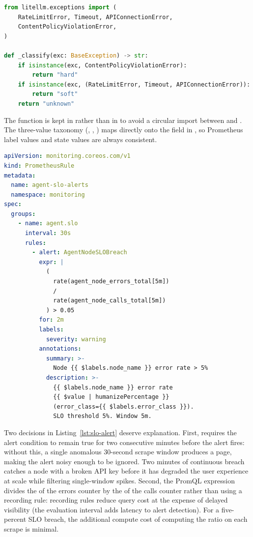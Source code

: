 \begin{lstlisting}[language=Python,
  caption={Exception classifier for Prometheus labels ---
    \texttt{src/observability/metrics.py} (continued)},
  label={lst:exception-classifier}]
from litellm.exceptions import (
    RateLimitError, Timeout, APIConnectionError,
    ContentPolicyViolationError,
)

def _classify(exc: BaseException) -> str:
    if isinstance(exc, ContentPolicyViolationError):
        return "hard"
    if isinstance(exc, (RateLimitError, Timeout, APIConnectionError)):
        return "soft"
    return "unknown"
\end{lstlisting}

The  function is kept in  rather than in
 to avoid a circular import between
 and . The three-value
taxonomy (, , ) maps directly
onto the  field in , so Prometheus
label values and state values are always consistent.

\begin{lstlisting}[language=yaml,
  caption={Prometheus alerting rule for SLO breach ---
    \texttt{k8s/alerts/agent-slo.yaml}},
  label={lst:slo-alert}]
apiVersion: monitoring.coreos.com/v1
kind: PrometheusRule
metadata:
  name: agent-slo-alerts
  namespace: monitoring
spec:
  groups:
    - name: agent.slo
      interval: 30s
      rules:
        - alert: AgentNodeSLOBreach
          expr: |
            (
              rate(agent_node_errors_total[5m])
              /
              rate(agent_node_calls_total[5m])
            ) > 0.05
          for: 2m
          labels:
            severity: warning
          annotations:
            summary: >-
              Node {{ $labels.node_name }} error rate > 5%
            description: >-
              {{ $labels.node_name }} error rate
              {{ $value | humanizePercentage }}
              (error_class={{ $labels.error_class }}).
              SLO threshold 5%. Window 5m.
\end{lstlisting}

Two decisions in Listing~\ref{lst:slo-alert} deserve explanation. First,
 requires the alert condition to remain true for two
consecutive minutes before the alert fires: without this, a single
anomalous 30-second scrape window produces a page, making the alert noisy
enough to be ignored. Two minutes of continuous breach catches a node with
a broken API key before it has degraded the user experience at scale while
filtering single-window spikes. Second, the PromQL expression divides the
 of the errors counter by the  of the calls
counter rather than using a recording rule: recording rules reduce query
cost at the expense of delayed visibility (the evaluation interval adds
latency to alert detection). For a five-percent SLO breach, the additional
compute cost of computing the ratio on each scrape is minimal.


